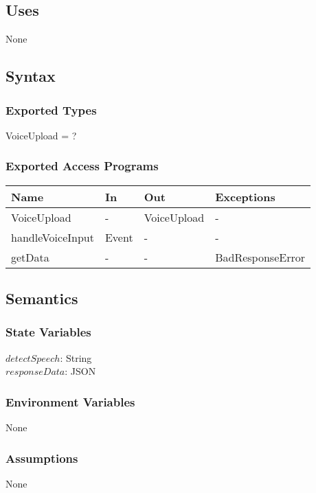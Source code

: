 \documentclass[12pt, titlepage]{article}
\begin{document}
\subsection{Uses}
None
\subsection{Syntax}
\subsubsection{Exported Types}
VoiceUpload = ?
\subsubsection{Exported Access Programs}
\begin{center}
	\begin{tabular}{p{3cm} p{4cm} p{4cm} p{2cm}}
		\hline
		\textbf{Name} & \textbf{In} & \textbf{Out} & \textbf{Exceptions} \\
		\hline
		VoiceUpload & - & VoiceUpload & - \\
		handleVoiceInput & Event & - & - \\
		getData & - & - & BadResponseError \\
		\hline
	\end{tabular}
\end{center}
\subsection{Semantics}
\subsubsection{State Variables}
$ detectSpeech $: String\\
$responseData$: JSON
\subsubsection{Environment Variables}
None
\subsubsection{Assumptions}
None
\end{document}
